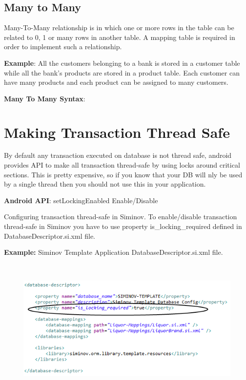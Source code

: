 	\subsection{Many to Many}
	Many-To-Many relationship is in which one or more rows in the table can be related to 0, 1 or many rows in another table. A mapping table is required in order to implement  such a relationship.

	\textbf{Example}: All the customers belonging to a bank is stored in a customer table while all the bank's products are stored in a product table. Each customer can have many products and each product can be assigned to many customers.
	
	\textbf{Many To Many Syntax}: 
		




\section{Making Transaction Thread Safe}
By default any transaction executed on database is not thread safe, android provides API to make all transaction thread-safe by using locks around critical sections. This is pretty expensive, so if you know that your DB will nly be used by a single thread then you should not use this in your application.

	\par
	\textbf{Android API}: setLockingEnabled Enable/Disable
		

Configuring transaction thread-safe in Siminov. To enable/disable transaction thread-safe in Siminov you have to use property is\_locking\_required defined in DatabaseDescriptor.si.xml file.

		\par
		\textbf{Example:} Siminov Template Application DatabaseDescriptor.si.xml file.
		\begin{figure}[htbp]
			\centering
				\includegraphics[height=7cm]{Resources/siminov_hybrid_template_application_is_locking_enable_example.png}
		\end{figure}


